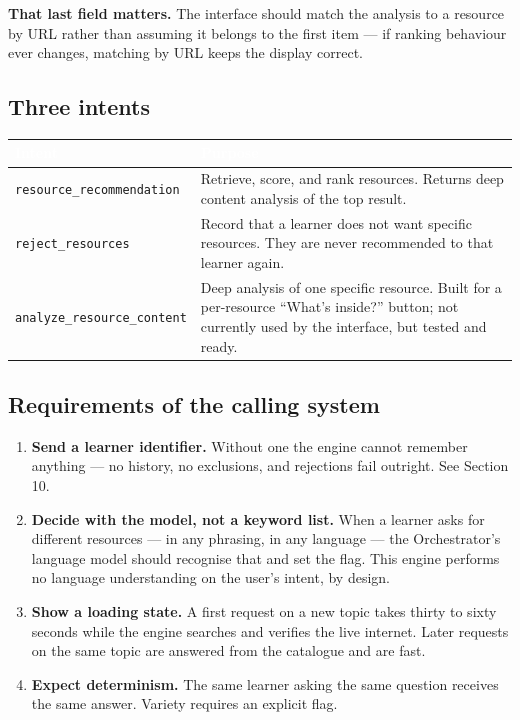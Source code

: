 \documentclass[11pt,a4paper]{article}
\newcommand{\code}[1]{\texttt{\small #1}}
\newcommand{\thead}[1]{\textcolor{white}{\bfseries\small #1}}
\newcommand{\headrow}{\rowcolor{navy}}
\begin{document}
\textbf{That last field matters.} The interface should match the analysis to a
resource by URL rather than assuming it belongs to the first item --- if
ranking behaviour ever changes, matching by URL keeps the display correct.

\subsection{Three intents}

\vspace{4pt}
\begin{tabularx}{\textwidth}{>{\raggedright\arraybackslash}p{5.4cm} >{\raggedright\arraybackslash}X}
\headrow \thead{Intent} & \thead{Purpose} \\
\midrule
\code{resource\_recommendation} & Retrieve, score, and rank resources. Returns deep content analysis of the top result. \\
\rowcolor{altshade} \code{reject\_resources} & Record that a learner does not want specific resources. They are never recommended to that learner again. \\
\code{analyze\_resource\_content} & Deep analysis of one specific resource. Built for a per-resource ``What's inside?'' button; not currently used by the interface, but tested and ready. \\
\bottomrule
\end{tabularx}
\vspace{8pt}

\subsection{Requirements of the calling system}

\begin{enumerate}
\item \textbf{Send a learner identifier.} Without one the engine cannot
remember anything --- no history, no exclusions, and rejections fail outright.
See Section 10.

\item \textbf{Decide with the model, not a keyword list.} When a learner asks
for different resources --- in any phrasing, in any language --- the
Orchestrator's language model should recognise that and set the flag. This
engine performs no language understanding on the user's intent, by design.

\item \textbf{Show a loading state.} A first request on a new topic takes
thirty to sixty seconds while the engine searches and verifies the live
internet. Later requests on the same topic are answered from the catalogue and
are fast.

\item \textbf{Expect determinism.} The same learner asking the same question
receives the same answer. Variety requires an explicit flag.
\end{enumerate}
\end{document}
